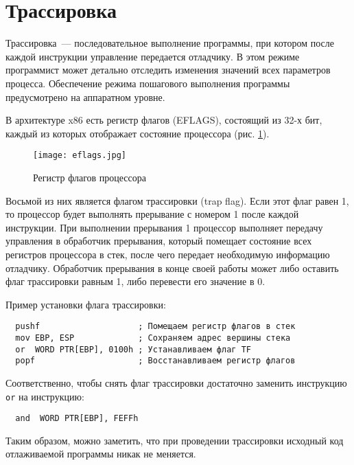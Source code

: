 
\section{Трассировка}
Трассировка~--- последовательное выполнение программы, при котором после каждой
инструкции управление передается отладчику. В этом режиме программист может
детально отследить изменения значений всех параметров процесса. Обеспечение
режима пошагового выполнения программы предусмотрено на аппаратном уровне.

В архитектуре x86 есть регистр флагов (EFLAGS), состоящий из 32-х бит, каждый из
которых отображает состояние процессора (рис.  \ref{fig:eflags}).
\begin{figure}[htpb]
  \centering
  \texttt{[image: eflags.jpg]}
  \caption{Регистр флагов процессора}
  \label{fig:eflags}
\end{figure}
Восьмой из них является флагом трассировки (trap flag). Если этот флаг равен 1,
то процессор будет выполнять прерывание с номером 1 после каждой инструкции. При
выполнении прерывания 1 процессор выполняет передачу управления в обработчик
прерывания, который помещает состояние всех регистров процессора в стек, после
чего передает необходимую информацию отладчику. Обработчик прерывания в конце
своей работы может либо оставить флаг трассировки равным 1, либо перевести его
значение в 0.

Пример установки флага трассировки:
\begin{verbatim}
  pushf                    ; Помещаем регистр флагов в стек
  mov EBP, ESP             ; Сохраняем адрес вершины стека
  or  WORD PTR[EBP], 0100h ; Устанавливаем флаг TF
  popf                     ; Восстанавливаем регистр флагов
\end{verbatim}
Соответственно, чтобы снять флаг трассировки достаточно заменить инструкцию
\verb!or! на инструкцию:
\begin{verbatim}
  and  WORD PTR[EBP], FEFFh
\end{verbatim}

Таким образом, можно заметить, что при проведении трассировки исходный код
отлаживаемой программы никак не меняется.
